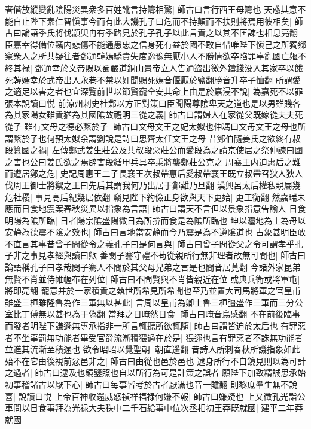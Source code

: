 奢僭放縱變亂隂陽災異衆多百姓訛言持籌相驚|{
	師古曰言行西王母籌也}
天惑其意不能自止陛下素仁智愼事今而有此大譏孔子曰危而不持顛而不扶則將焉用彼相矣|{
	師古曰論語季氏將伐顓臾冉有季路見於孔子孔子以此言責之以其不匡諫也相息亮翻}
臣嘉幸得備位竊内悲傷不能通愚忠之信身死有益於國不敢自惜唯陛下愼己之所獨鄉察衆人之所共疑往者鄧通韓嫣驕貴失度逸豫無厭小人不勝情欲卒陷罪辜亂國亡軀不終其禄|{
	鄧通幸於文帝賜以蜀嚴道銅山景帝立人告通盜出徼外鑄錢没入其家卒以餓死韓嫣幸於武帝出入永巷不禁以奸聞賜死嫣音偃厭於鹽翻勝音升卒子恤翻}
所謂愛之適足以害之者也宜深覽前世以節賢寵全安其命上由是於嘉浸不說|{
	為嘉死不以罪張本說讀曰悦}
前涼州刺史杜鄴以方正對策曰臣聞陽尊隂卑天之道也是以男雖賤各為其家陽女雖貴猶為其國隂故禮明三從之義|{
	師古曰謂婦人在家從父既嫁從夫夫死從子}
雖有文母之德必繫於子|{
	師古曰文母文王之妃太姒也仲馮曰文母文王之母也所謂繫於子也何預太姒余謂劉說是詩曰思齊太任文王之母}
昔鄭伯隨姜氏之欲終有叔段簒國之禍|{
	左傳鄭武姜生莊公及共叔段惡莊公而愛段為之請京使居之祭仲諫曰國之害也公曰姜氏欲之焉辟害段繕甲兵具卒乘將襲鄭莊公克之}
周襄王内迫惠后之難而遭居鄭之危|{
	史記周惠王二子長襄王次叔帶惠后愛叔帶襄王既立叔帶召狄人狄人伐周王御士將禦之王曰先后其謂我何乃出居于鄭難乃旦翻}
漢興呂太后權私親屬幾危社稷|{
	事見高后紀幾居依翻}
竊見陛下約儉正身欲與天下更始|{
	更工衡翻}
然嘉瑞未應而日食地震案春秋災異以指象為言語|{
	師古曰謂天不言但以景象指意告諭人}
日食明陽為隂所臨|{
	日者陽宗隂盛陽微日為所揜而食是為隂所臨也}
坤以灋地為土為母以安静為德震不隂之效也|{
	師古曰言地當安静而今乃震是為不遵隂道也}
占象甚明臣敢不直言其事昔曾子問從令之義孔子曰是何言與|{
	師古曰曾子問從父之令可謂孝乎孔子非之事見孝經與讀曰歟}
善閔子騫守禮不苟從親所行無非理者故無可間也|{
	師古曰論語稱孔子曰孝哉閔子騫人不間於其父母兄弟之言是也間音居莧翻}
今諸外家昆弟無賢不肖並侍帷幄布在列位|{
	師古曰不問賢與不肖皆親近在位}
或典兵衛或將軍屯|{
	將即亮翻}
寵意并於一家積貴之埶世所希見所希聞也至乃並置大司馬將軍之官皇甫雖盛三桓雖隆魯為作三軍無以甚此|{
	言周以皇甫為卿士魯三桓彊盛作三軍而三分公室比丁傅無以甚也為于偽翻}
當拜之日晻然日食|{
	師古曰晻音烏感翻}
不在前後臨事而發者明陛下謙遜無專承指非一所言輒聽所欲輒隨|{
	師古曰謂皆迫於太后也}
有罪惡者不坐辜罰無功能者畢受官爵流漸積猥過在於是|{
	猥遝也言有罪惡者不誅無功能者並進其流漸至積遝也}
欲令昭昭以覺聖朝|{
	朝直遥翻}
昔詩人所刺春秋所譏指象如此殆不在它由後視前忿邑非之|{
	師古曰由從也邑於邑也}
逮身所行不自鏡見則以為可計之過者|{
	師古曰逮及也鏡鑒照也自以所行為可是計策之誤者}
願陛下加致精誠思承始初事稽諸古以厭下心|{
	師古曰每事皆考於古者厭滿也音一贍翻}
則黎庶羣生無不說喜|{
	說讀曰悦}
上帝百神收還威怒禎祥福禄何嫌不報|{
	師古曰嫌疑也}
上又徵孔光詣公車問以日食事拜為光禄大夫秩中二千石給事中位次丞相初王莽既就國|{
	建平二年莽就國}
